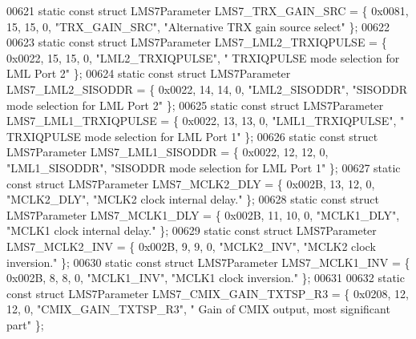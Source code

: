 \begin{DoxyCode}
00621 \textcolor{keyword}{static} \textcolor{keyword}{const} \textcolor{keyword}{struct }LMS7Parameter LMS7_TRX_GAIN_SRC = \{ 0x0081, 15, 15, 0, \textcolor{stringliteral}{"TRX\_GAIN\_SRC"}, \textcolor{stringliteral}{"Alternative TRX
       gain source select"} \};
00622 
00623 \textcolor{keyword}{static} \textcolor{keyword}{const} \textcolor{keyword}{struct }LMS7Parameter LMS7_LML2_TRXIQPULSE = \{ 0x0022, 15, 15, 0, \textcolor{stringliteral}{"LML2\_TRXIQPULSE"}, \textcolor{stringliteral}{"
      TRXIQPULSE mode selection for LML Port 2"} \};
00624 \textcolor{keyword}{static} \textcolor{keyword}{const} \textcolor{keyword}{struct }LMS7Parameter LMS7_LML2_SISODDR = \{ 0x0022, 14, 14, 0, \textcolor{stringliteral}{"LML2\_SISODDR"}, \textcolor{stringliteral}{"SISODDR mode
       selection for LML Port 2"} \};
00625 \textcolor{keyword}{static} \textcolor{keyword}{const} \textcolor{keyword}{struct }LMS7Parameter LMS7_LML1_TRXIQPULSE = \{ 0x0022, 13, 13, 0, \textcolor{stringliteral}{"LML1\_TRXIQPULSE"}, \textcolor{stringliteral}{"
      TRXIQPULSE mode selection for LML Port 1"} \};
00626 \textcolor{keyword}{static} \textcolor{keyword}{const} \textcolor{keyword}{struct }LMS7Parameter LMS7_LML1_SISODDR = \{ 0x0022, 12, 12, 0, \textcolor{stringliteral}{"LML1\_SISODDR"}, \textcolor{stringliteral}{"SISODDR mode
       selection for LML Port 1"} \};
00627 \textcolor{keyword}{static} \textcolor{keyword}{const} \textcolor{keyword}{struct }LMS7Parameter LMS7_MCLK2_DLY = \{ 0x002B, 13, 12, 0, \textcolor{stringliteral}{"MCLK2\_DLY"}, \textcolor{stringliteral}{"MCLK2 clock internal
       delay."} \};
00628 \textcolor{keyword}{static} \textcolor{keyword}{const} \textcolor{keyword}{struct }LMS7Parameter LMS7_MCLK1_DLY = \{ 0x002B, 11, 10, 0, \textcolor{stringliteral}{"MCLK1\_DLY"}, \textcolor{stringliteral}{"MCLK1 clock internal
       delay."} \};
00629 \textcolor{keyword}{static} \textcolor{keyword}{const} \textcolor{keyword}{struct }LMS7Parameter LMS7_MCLK2_INV = \{ 0x002B, 9, 9, 0, \textcolor{stringliteral}{"MCLK2\_INV"}, \textcolor{stringliteral}{"MCLK2 clock inversion."}
       \};
00630 \textcolor{keyword}{static} \textcolor{keyword}{const} \textcolor{keyword}{struct }LMS7Parameter LMS7_MCLK1_INV = \{ 0x002B, 8, 8, 0, \textcolor{stringliteral}{"MCLK1\_INV"}, \textcolor{stringliteral}{"MCLK1 clock inversion."}
       \};
00631 
00632 \textcolor{keyword}{static} \textcolor{keyword}{const} \textcolor{keyword}{struct }LMS7Parameter LMS7_CMIX_GAIN_TXTSP_R3 = \{ 0x0208, 12, 12, 0, \textcolor{stringliteral}{"CMIX\_GAIN\_TXTSP\_R3"}, \textcolor{stringliteral}{"
      Gain of CMIX output, most significant part"} \};

\end{DoxyCode}
